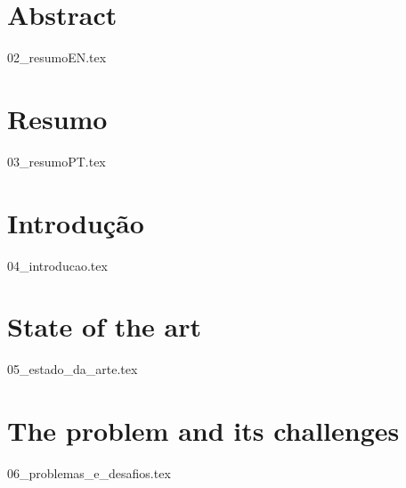 \documentclass[
  oneside,
  11pt, a4paper,
  footinclude=true,
  headinclude=true,
  cleardoublepage=empty
]{scrbook}
\author{José Carlos Lima Martins}
\date{\myear} %
\begin{document}
    \umfrontcover{}
    \umtitlepage{}
	

	\chapter*{Abstract}
    {02_resumoEN.tex}
	
    \cleardoublepage{}
	\chapter*{Resumo}
    {03_resumoPT.tex}
	
	\tableofcontents
	\listoffigures
	\listoftables
    \printglossary[]
    \printglossary[type=\acronymtype, title=Lista de Acrónimos]
	
	
	\chapter{Introdução}
    {04_introducao.tex}

	\chapter{State of the art}
    {05_estado_da_arte.tex}

	\chapter{The problem and its challenges}
    {06_problemas_e_desafios.tex}

		
\end{document}
